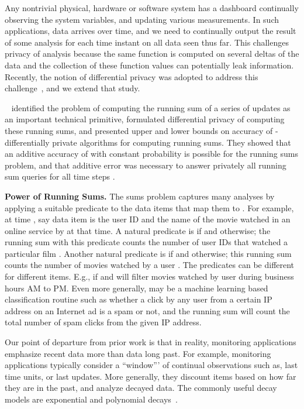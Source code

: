 Any nontrivial physical, hardware or software system has a dashboard continually observing the system variables, and updating various measurements.  In such applications, data arrives over time, and we need to continually output the result of some analysis  
for each time instant  on all data seen thus far.  This challenges privacy of analysis because the same function is computed on several deltas of the data and the collection of these function values can potentially leak information.
Recently, the notion of differential privacy was adopted to address this challenge~\cite{dwork-continual,chan2010private}, and we extend that study.


~\cite{dwork-continual,chan2010private} identified the problem of computing the running sum of a series of  updates as an important technical primitive, formulated differential privacy of computing these running sums, and presented upper and lower bounds on accuracy of -differentially private algorithms for computing running sums. They showed that an additive accuracy of  with constant probability is possible for the running sums problem, and that  additive error was necessary to answer privately all running sum queries for all time steps . 

\medskip
\noindent
{\bf Power of Running Sums.} The sums problem 
captures many analyses by  applying a suitable predicate  to the data items that map them to . 
For example, at time , say data item  is the user ID  and the name of the movie  watched in an online service by  at that time. A natural predicate is  if  and  otherwise; the running sum with this predicate counts the number of user IDs that watched a particular film . Another natural predicate is 
 if  and  otherwise; this running sum counts the number of movies watched by a user .  The predicates can be different for different items. E.g., 
 if  and  will filter movies watched by user  during business hours  AM to  PM.  Even more generally,  may be 
a machine learning based classification routine such as whether a
click by any user from a certain IP address on an Internet ad is a
spam or not, and the running sum will count the total number of spam clicks from the given IP address. \hfill

\medskip
Our point of departure from prior work is that in reality, monitoring applications emphasize recent data more than data long past.  For example, monitoring applications typically consider a  ``window''' of continual observations such as, last  time units, or last  updates.  More generally, they discount items based on how far they are in the past, and analyze decayed data.
The commonly useful decay models  are exponential and polynomial 
decays~\cite{datar2002maintaining,cohen2003maintaining}. 

